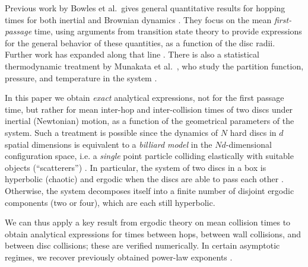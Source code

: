 \documentclass[superscriptaddress,pre,reprint,showpacs,twocolumn]{revtex4-1}
\newcommand{\etal}{et al.\ }
\begin{document}
 
Previous work
by Bowles \etal gives general quantitative results for hopping times 
for both inertial and Brownian dynamics \cite{Bowles04}. They focus
on the mean \emph{first-passage} time, using arguments from transition state theory 
to provide expressions for the general behavior of these quantities, as a function of the
disc radii. %
Further work has expanded along that line  \cite{Suh05, Ball09}.
There is also a statistical thermodynamic treatment by Munakata \etal, 
who study the partition function, pressure,
and temperature in the system \cite{Munakata02, Munakata06}. 


In this paper we obtain \emph{exact} analytical expressions, not for the first passage time,
but rather for mean inter-hop and inter-collision times of two discs under 
inertial (Newtonian) motion, as a function of the geometrical parameters of the system. Such a treatment is possible
 since the dynamics of $N$ hard discs in $d$ spatial dimensions
 is equivalent to a \emph{billiard model} in the $Nd$-dimensional configuration space, i.e. a \emph{single} point particle colliding elastically 
with suitable objects (``scatterers'') \cite{SzaszBook00}. 
In particular, the system of two discs in a box is hyperbolic (chaotic) and ergodic when the discs are able to pass each other \cite{Sim99}. Otherwise, the system decomposes itself into
a finite number of disjoint ergodic components (two or four), which are each still hyperbolic.

We can thus apply a key result from ergodic theory on mean collision times \cite{Chernov97} to obtain analytical expressions 
for times between hops, between wall collisions, and between disc collisions; these are verified numerically. 
In certain asymptotic regimes, we recover previously obtained power-law exponents \cite{Bowles04}.


\end{document}
